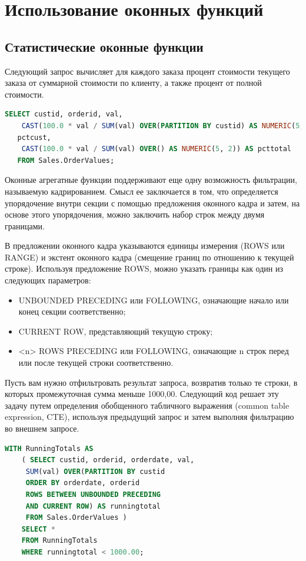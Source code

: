\section{Использование оконных функций}

\subsection{Статистические оконные функции}

Следующий запрос вычисляет для каждого заказа процент стоимости текущего заказа от суммарной стоимости по клиенту, а
также процент от полной стоимости. 


\begin{lstlisting}[label=lst:funcReturn, language=sql]
	SELECT custid, orderid, val,
	CAST(100.0 * val / SUM(val) OVER(PARTITION BY custid) AS NUMERIC(5, 2)) AS
   pctcust,
	CAST(100.0 * val / SUM(val) OVER() AS NUMERIC(5, 2)) AS pcttotal
   FROM Sales.OrderValues;
\end{lstlisting}

Оконные агрегатные функции поддерживают еще одну возможность фильтрации,
называемую кадрированием. Смысл ее заключается в том, что определяется упорядочение внутри секции с помощью предложения оконного кадра и затем, на основе
этого упорядочения, можно заключить набор строк между двумя границами.

В предложении оконного кадра указываются единицы измерения (ROWS или RANGE) и
экстент оконного кадра (смещение границ по отношению к текущей строке). Используя предложение ROWS, можно указать границы как один из следующих параметров:

\begin{itemize}
	\item UNBOUNDED PRECEDING или FOLLOWING, означающие начало или конец секции соответственно; 
	\item CURRENT ROW, представляющий текущую строку;
	\item <n> ROWS PRECEDING или FOLLOWING, означающие n строк перед или после текущей
	строки соответственно. 
\end{itemize}

Пусть вам нужно отфильтровать результат запроса, возвратив только те
строки, в которых промежуточная сумма меньше 1000,00. Следующий код решает
эту задачу путем определения обобщенного табличного выражения (common table
expression, CTE), используя предыдущий запрос и затем выполняя фильтрацию во
внешнем запросе. 

\begin{lstlisting}[label=lst:funcReturn, language=sql]
	WITH RunningTotals AS
	( SELECT custid, orderid, orderdate, val,
	 SUM(val) OVER(PARTITION BY custid
	 ORDER BY orderdate, orderid
	 ROWS BETWEEN UNBOUNDED PRECEDING
	 AND CURRENT ROW) AS runningtotal
	 FROM Sales.OrderValues )
	SELECT *
	FROM RunningTotals
	WHERE runningtotal < 1000.00; 
\end{lstlisting}

